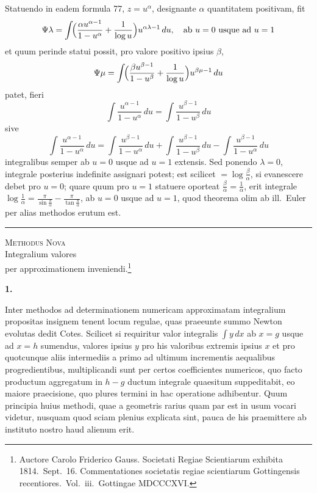 \documentclass[12pt,a4paper]{article}
\newcommand{\art}[1]{\par\medskip\noindent\textbf{#1.}\par\nopagebreak\smallskip}
\begin{document}
Statuendo in eadem formula 77, $z=u^\alpha$, designante $\alpha$ quantitatem positivam, fit
\[
\Psi\lambda = \int\!\Bigl(\frac{\alpha u^{\alpha-1}}{1-u^\alpha} + \frac{1}{\log u}\Bigr)u^{\alpha\lambda-1}\,du,\quad \text{ab }u=0\text{ usque ad }u=1
\]
et quum perinde statui possit, pro valore positivo ipsius $\beta$,
\[
\Psi\mu = \int\!\Bigl(\frac{\beta u^{\beta-1}}{1-u^\beta} + \frac{1}{\log u}\Bigr)u^{\beta\mu-1}\,du
\]
patet, fieri
\[
\int\!\frac{u^{\alpha-1}}{1-u^\alpha}\,du = \int\!\frac{u^{\beta-1}}{1-u^\beta}\,du
\]
sive
\[
\int\!\frac{u^{\alpha-1}}{1-u^\alpha}\,du = \int\!\frac{u^{\beta-1}}{1-u^\alpha}\,du + \int\!\frac{u^{\beta-1}}{1-u^\beta}\,du - \int\!\frac{u^{\beta-1}}{1-u^\alpha}\,du
\]
integralibus semper ab $u=0$ usque ad $u=1$ extensis. Sed ponendo $\lambda=0$, integrale posterius indefinite assignari potest; est scilicet $=\log\frac{\beta}{\alpha}$, si evanescere debet pro $u=0$; quare quum pro $u=1$ statuere oporteat $\frac{\beta}{\alpha}=\frac{1}{\alpha}$, erit integrale $\log\frac{1}{\alpha}=\frac{\pi}{\sin\frac{\pi}{\alpha}}-\frac{\pi}{\tan\frac{\pi}{\alpha}}$, ab $u=0$ usque ad $u=1$, quod theorema olim ab ill.\ Euler per alias methodos erutum est.

\vspace{2em}
\begin{center}
\rule{0.5\textwidth}{0.4pt}
\end{center}
\vspace{2em}

\begin{center}
\Large\textsc{Methodus Nova}\\[0.5em]
\large Integralium valores\\[0.3em]
\large per approximationem inveniendi.\footnote{Auctore Carolo Friderico Gauss. Societati Regiae Scientiarum exhibita 1814.\ Sept.\ 16. Commentationes societatis regiae scientiarum Gottingensis recentiores.\ Vol.\ iii.\ Gottingae MDCCCXVI.}
\end{center}

\vspace{1em}

\art{1}

Inter methodos ad determinationem numericam approximatam integralium propositas insignem tenent locum regulae, quas praeeunte summo Newton evolutas dedit Cotes. Scilicet si requiritur valor integralis $\int\!y\,dx$ ab $x=g$ usque ad $x=h$ sumendus, valores ipsius $y$ pro his valoribus extremis ipsius $x$ et pro quotcunque aliis intermediis a primo ad ultimum incrementis aequalibus progredientibus, multiplicandi sunt per certos coefficientes numericos, quo facto productum aggregatum in $h-g$ ductum integrale quaesitum suppeditabit, eo maiore praecisione, quo plures termini in hac operatione adhibentur. Quum principia huius methodi, quae a geometris rarius quam par est in usum vocari videtur, nusquam quod sciam plenius explicata sint, pauca de his praemittere ab instituto nostro haud alienum erit.
\end{document}
